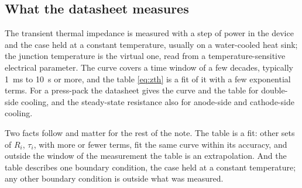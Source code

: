 \documentclass[10pt,a4paper]{scrartcl}
\begin{document}
\subsection{What the datasheet measures}
The transient thermal impedance is measured with a step of power in the device and the case held at a constant temperature, usually on a water-cooled heat sink; the junction temperature is the virtual one, read from a temperature-sensitive electrical parameter. The curve covers a time window of a few decades, typically \SI{1}{\milli\second} to \SI{10}{\second} or more, and the table \eqref{eq:zth} is a fit of it with a few exponential terms. For a press-pack the datasheet gives the curve and the table for double-side cooling, and the steady-state resistance also for anode-side and cathode-side cooling.

Two facts follow and matter for the rest of the note. The table is a fit: other sets of $R_i$, $\tau_i$, with more or fewer terms, fit the same curve within its accuracy, and outside the window of the measurement the table is an extrapolation. And the table describes one boundary condition, the case held at a constant temperature; any other boundary condition is outside what was measured.
\end{document}
